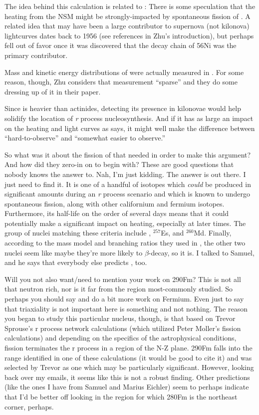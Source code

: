 The idea behind this {\Cf} calculation is related to \cite{Zhu2018}: There is some speculation that the heating from the NSM might be strongly-impacted by spontaneous fission of {\Cf}. A related idea that {\Cf} may have been a large contributor to supernova (not kilonova) lightcurves dates back to 1956 (see references in Zhu's introduction), but perhaps fell out of favor once it was discovered that the decay chain of 56Ni was the primary contributor.

Mass and kinetic energy distributions of {\Cf} were actually measured in \cite{Brandt1963}. For some reason, though, Zhu considers that measurement ``sparse'' and they do some dressing up of it in their paper.

Since {\Cf} is heavier than actinides, detecting its presence in kilonovae would help solidify the location of \textit{r} process nucleosynthesis. And if it has as large an impact on the heating and light curves as \cite{Zhu2018} says, it might well make the difference between ``hard-to-observe'' and ``somewhat easier to observe.''

So what was it about the fission of {\Cf} that \cite{Zhu2018} needed in order to make this argument? And how did they zero-in on {\Cf} to begin with? These are good questions that nobody knows the answer to. Nah, I'm just kidding. The answer is out there. I just need to find it. It is one of a handful of isotopes which \textit{could} be produced in significant amounts during an \textit{r} process scenario and which is known to undergo spontaneous fission, along with other californium and fermium isotopes. Furthermore, its half-life on the order of several days means that it could potentially make a significant impact on heating, especially at later times. The group of nuclei matching these criteria include {\Cf}, $^{257}$Es, and $^{260}$Md. Finally, according to the mass model and branching ratios they used in \cite{Zhu2018}, the other two nuclei seem like maybe they're more likely to $\beta$-decay, so {\Cf} it is. I talked to Samuel, and he says that everybody else predicts {\Cf}, too.

Will you not also want/need to mention your work on 290Fm? This {\Cf} is not all that neutron rich, nor is it far from the region most-commonly studied. So perhaps you should say and do a bit more work on Fermium. Even just to say that triaxiality is not important here is something and not nothing. The reason you began to study this particular nucleus, though, is that based on Trevor Sprouse's r process network calculations (which utilized Peter Moller's fission calculations) and depending on the specifics of the astrophysical conditions, fission terminates the r process in a region of the N-Z plane. 290Fm falls into the range identified in one of these calculations (it would be good to cite it) and was selected by Trevor as one which may be particularly significant. However, looking back over my emails, it seems like this is not a robust finding. Other predictions (like the ones I have from Samuel and Marius Eichler) seem to perhaps indicate that I'd be better off looking in the region for which 280Fm is the northeast corner, perhaps.